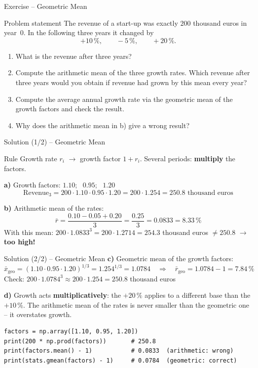 \documentclass[aspectratio=169,11pt]{beamer}
\begin{document}
\begin{frame}{Exercise -- Geometric Mean}
  \begin{block}{Problem statement}
    The revenue of a start-up was exactly $200$ thousand euros in year~0. In the following
    three years it changed by
    \[ +10\,\%, \qquad -5\,\%, \qquad +20\,\%. \]
    \begin{enumerate}
      \item[a)] What is the revenue after three years?
      \item[b)] Compute the arithmetic mean of the three growth rates. Which revenue after three
        years would you obtain if revenue had grown by this mean every year?
      \item[c)] Compute the average annual growth rate via the geometric mean of the growth
        factors and check the result.
      \item[d)] Why does the arithmetic mean in b) give a wrong result?
    \end{enumerate}
  \end{block}
\end{frame}

\begin{frame}{Solution (1/2) -- Geometric Mean}
  \begin{block}{Rule}
    Growth rate $r_i$ $\to$ growth factor $1 + r_i$. Several periods: \textbf{multiply} the factors.
  \end{block}

  \textbf{a)} Growth factors: $1.10$; \ $0.95$; \ $1.20$
  \[ \text{Revenue}_3 = 200 \cdot 1.10 \cdot 0.95 \cdot 1.20 = 200 \cdot 1.254 = \mathbf{250.8} \text{ thousand euros} \]

  \textbf{b)} Arithmetic mean of the rates:
  \[ \bar{r} = \frac{0.10 - 0.05 + 0.20}{3} = \frac{0.25}{3} = 0.0833 = \mathbf{8.33\,\%} \]
  With this mean: $200 \cdot 1.0833^3 = 200 \cdot 1.2714 = \mathbf{254.3}$ thousand euros
  $\neq 250.8$ $\to$ \textbf{too high!}
\end{frame}

\begin{frame}[fragile]{Solution (2/2) -- Geometric Mean}
  \textbf{c)} Geometric mean of the growth factors:
  \[ \bar{x}_{\text{geo}} = \left(1.10 \cdot 0.95 \cdot 1.20\right)^{1/3} = 1.254^{1/3} = \mathbf{1.0784}
     \quad\Rightarrow\quad \bar{r}_{\text{geo}} = 1.0784 - 1 = \mathbf{7.84\,\%} \]
  Check: $200 \cdot 1.0784^3 \approx 200 \cdot 1.254 = 250.8$ thousand euros \checkmark

  \textbf{d)} Growth acts \textbf{multiplicatively}: the $+20\,\%$ applies to a different base than
  the $+10\,\%$. The arithmetic mean of the rates is never smaller than the geometric one --
  it overstates growth.
\begin{lstlisting}[belowskip=2pt]
factors = np.array([1.10, 0.95, 1.20])
print(200 * np.prod(factors))       # 250.8
print(factors.mean() - 1)           # 0.0833  (arithmetic: wrong)
print(stats.gmean(factors) - 1)     # 0.0784  (geometric: correct)
\end{lstlisting}
\end{frame}
\end{document}
